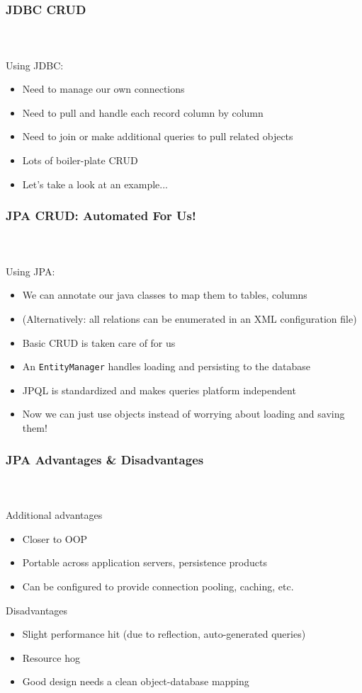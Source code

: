 \documentclass{beamer}
\begin{document}
\begin{frame}
  \frametitle{JDBC CRUD}
  \framesubtitle{~}

Using JDBC:
\begin{itemize}
  \item Need to manage our own connections
  \item Need to pull and handle each record column by column
  \item Need to join or make additional queries to pull related objects
  \item Lots of boiler-plate CRUD
  \item Let's take a look at an example...
\end{itemize}

\end{frame}

\begin{frame}[fragile]
  \frametitle{JPA CRUD: Automated For Us!}
  \framesubtitle{~}

Using JPA:
\begin{itemize}
  \item We can annotate our java classes to map them to tables, columns
  \item (Alternatively: all relations can be enumerated in an XML configuration file)
  \item Basic CRUD is taken care of for us
  \item An \lstinline|EntityManager| handles loading and persisting to the database
  \item JPQL is standardized and makes queries platform independent
  \item Now we can just use objects instead of worrying about loading and saving them!

\end{itemize}

\end{frame}

\begin{frame}[fragile]
  \frametitle{JPA Advantages \& Disadvantages}
  \framesubtitle{~}

Additional advantages
\begin{itemize}
  \item Closer to OOP
  \item Portable across application servers, persistence products
  \item Can be configured to provide connection pooling, caching, etc.
\end{itemize}

Disadvantages
\begin{itemize}
  \item Slight performance hit (due to reflection, auto-generated queries)
  \item Resource hog
  \item Good design needs a clean object-database mapping
\end{itemize}

\end{frame}
\end{document}
